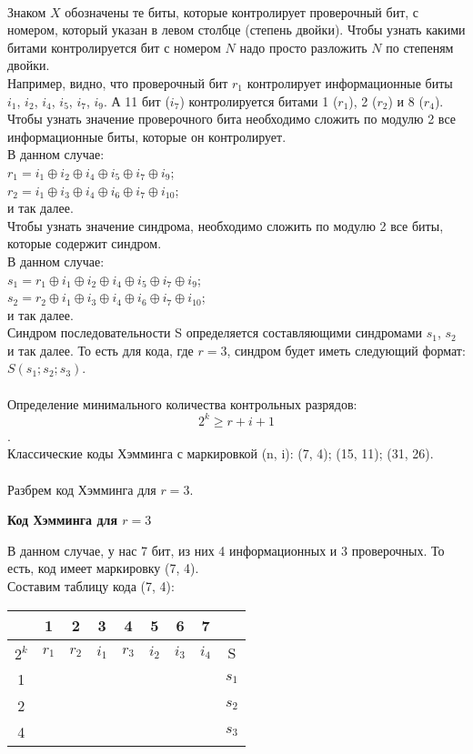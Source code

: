\\Знаком $X$ обозначены те биты, которые контролирует проверочный бит, с номером, который указан в левом столбце (степень двойки). Чтобы узнать какими битами контролируется бит с номером $N$ надо просто разложить $N$ по степеням двойки.
\\Например, видно, что проверочный бит $r_1$ контролирует информационные биты $i_1$, $i_2$, $i_4$, $i_5$, $i_7$, $i_9$. А 11 бит ($i_7$) контролируется битами 1 ($r_1$), 2 ($r_2$) и 8 ($r_4$).
\\Чтобы узнать значение проверочного бита необходимо сложить по модулю 2 все информационные биты, которые он контролирует.
\\В данном случае:
\\$r_1 = i_1\oplus i_2\oplus i_4\oplus i_5\oplus i_7\oplus i_9$;
\\$r_2 = i_1\oplus i_3\oplus i_4\oplus i_6\oplus i_7\oplus i_10$;
\\и так далее.
\\Чтобы узнать значение синдрома, необходимо сложить по модулю 2 все биты, которые содержит синдром.
\\В данном случае:
\\$s_1 = r_1\oplus i_1\oplus i_2\oplus i_4\oplus i_5\oplus i_7\oplus i_9$;
\\$s_2 = r_2\oplus i_1\oplus i_3\oplus i_4\oplus i_6\oplus i_7\oplus i_{10}$;
\\и так далее.
\\Синдром последовательности S определяется составляющими синдромами $s_1$, $s_2$ и так далее. То есть для кода, где $r = 3$, синдром будет иметь следующий формат: $S(s_1;s_2;s_3)$.
\\
\\Определение минимального количества контрольных разрядов: $$2^k \ge r + i + 1$$.
\\Классические коды Хэмминга с маркировкой (n, i): (7, 4); (15, 11); (31, 26).
\\
\\Разбрем код Хэмминга для $r = 3$.
\begin{center}
\textbf{Код Хэмминга для $r = 3$}
\end{center}
В данном случае, у нас 7 бит, из них 4 информационных и 3 проверочных. То есть, код имеет маркировку (7, 4).
\\Составим таблицу кода (7, 4):
\begin{table}[h]
\begin{tabular}{|c|c|c|c|c|c|c|c|c|}
\hline
& 1 & 2 & 3 & 4 & 5 & 6 & 7 & \\
\hline
$2^k$ & $r_{1}$ & $r_{2}$ & $i_{1}$ & $r_{3}$ & $i_{2}$ & $i_{3}$ & $i_{4}$ & S\\
\hline
1 & \cellcolor{Gray1}{X} & & \cellcolor{Gray1}{X} & & \cellcolor{Gray1}{X} & & \cellcolor{Gray1}{X} & $s_{1}$\\
\hline
2 & & \cellcolor{Gray2}{X} & \cellcolor{Gray2}{X} & & & \cellcolor{Gray2}{X} & \cellcolor{Gray2}{X} & $s_{2}$ \\
\hline
4 & & & & \cellcolor{Gray3}{X} & \cellcolor{Gray3}{X} & \cellcolor{Gray3}{X} & \cellcolor{Gray3}{X} & $s_{3}$ \\
\hline
\end{tabular}
\end{table}
